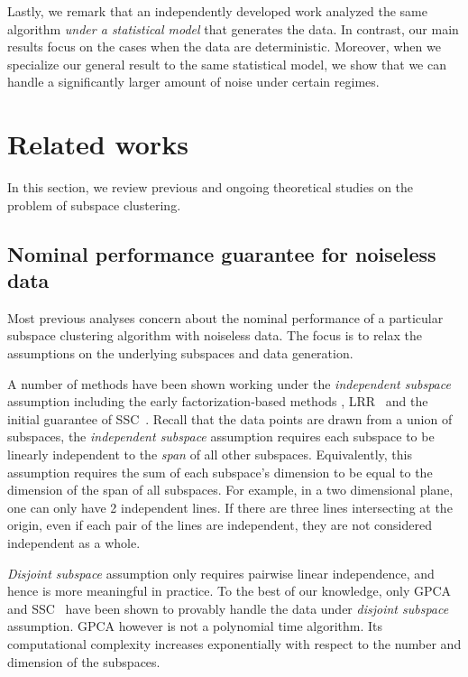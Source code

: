\documentclass[main]{subfiles}
\begin{document}
Lastly, we remark that an independently developed work \cite{soltanolkotabi2013robust} analyzed the same algorithm {\em under a statistical model} that generates the data. In contrast, our main results focus on the cases when the data are deterministic. Moreover, when we specialize our general result to the same statistical model, we show that we can handle a significantly larger amount of noise under certain regimes.



\section{Related works}\label{sec:RelatedWorks}
In this section, we review  previous and ongoing theoretical studies on the problem of subspace clustering.

\subsection{Nominal performance guarantee for noiseless data}
Most previous analyses concern about the nominal performance of a particular subspace clustering algorithm with noiseless data. The focus is to relax the assumptions on the underlying subspaces and data generation.

A number of methods have been shown working under the \emph{independent subspace} assumption including the early factorization-based methods \cite{costeira1998motion_seg,kanatani2001motion}, LRR~\cite{liu2010lrr_icml} and the initial guarantee of SSC~\cite{elhamifar2009ssc}. Recall that the data points are drawn from a union of subspaces, the \emph{independent subspace } assumption requires each subspace to be linearly independent to the {\em span} of all other subspaces. Equivalently, this assumption requires the sum of each subspace's dimension to be equal to the dimension of the span of all subspaces. For example, in a two dimensional plane, one can only have 2 independent lines. If there are three lines intersecting at the origin, even if each pair of the lines are independent, they are not considered independent as a whole.

\emph{Disjoint subspace} assumption only requires pairwise linear independence, and hence is more meaningful in practice. To the best of our knowledge, only GPCA~\cite{vidal2005gpca} and SSC~\cite{elhamifar2010ssc_icassp,elhamifar2012ssc_journal} have been shown to provably handle the data under \emph{disjoint subspace} assumption. GPCA however is not a polynomial time algorithm. Its computational complexity increases exponentially with respect to the number and dimension of the subspaces.
\end{document}
